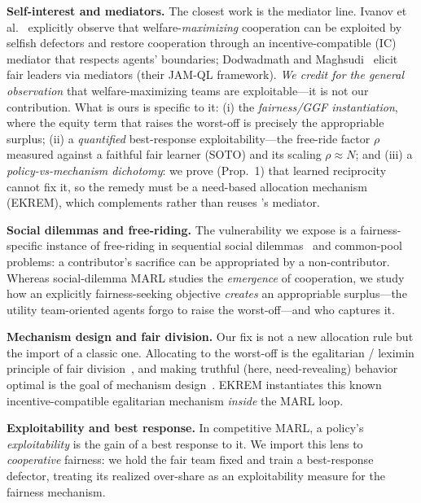 \documentclass[conference, a4paper]{IEEEtran}
\begin{document}
\textbf{Self-interest and mediators.} The closest work is the mediator line.
Ivanov et al.~\cite{ivanov2023mediated} explicitly observe that
welfare-\emph{maximizing} cooperation can be exploited by selfish defectors and
restore cooperation through an incentive-compatible (IC) mediator that respects
agents' boundaries; Dodwadmath and Maghsudi~\cite{dodwadmath2025mediators} elicit
fair leaders via mediators (their JAM-QL framework). \emph{We credit
\cite{ivanov2023mediated} for the general observation} that welfare-maximizing
teams are exploitable---it is not our contribution. What is ours is specific to it:
(i) the \emph{fairness/GGF instantiation}, where the equity term that raises the
worst-off is precisely the appropriable surplus; (ii) a \emph{quantified}
best-response exploitability---the free-ride factor $\rho$ measured against a
faithful fair learner (SOTO) and its scaling $\rho\!\approx\!N$; and (iii) a
\emph{policy-vs-mechanism dichotomy}: we prove (Prop.~1) that learned reciprocity
cannot fix it, so the remedy must be a need-based allocation mechanism (EKREM),
which complements rather than reuses \cite{ivanov2023mediated}'s mediator.

\textbf{Social dilemmas and free-riding.} The vulnerability we expose is a
fairness-specific instance of free-riding in sequential social
dilemmas~\cite{leibo2017ssd} and common-pool problems: a contributor's sacrifice
can be appropriated by a non-contributor. Whereas social-dilemma MARL studies the
\emph{emergence} of cooperation, we study how an explicitly fairness-seeking
objective \emph{creates} an appropriable surplus---the utility team-oriented agents
forgo to raise the worst-off---and who captures it.

\textbf{Mechanism design and fair division.} Our fix is not a new allocation rule
but the import of a classic one. Allocating to the worst-off is the egalitarian /
leximin principle of fair division~\cite{moulin2003fair}, and making truthful
(here, need-revealing) behavior optimal is the goal of mechanism
design~\cite{nisan2001amd}. EKREM instantiates this known incentive-compatible
egalitarian mechanism \emph{inside} the MARL loop.

\textbf{Exploitability and best response.} In competitive MARL, a policy's
\emph{exploitability} is the gain of a best response to it. We import this lens to
\emph{cooperative} fairness: we hold the fair team fixed and train a best-response
defector, treating its realized over-share as an exploitability measure for the
fairness mechanism.
\end{document}

